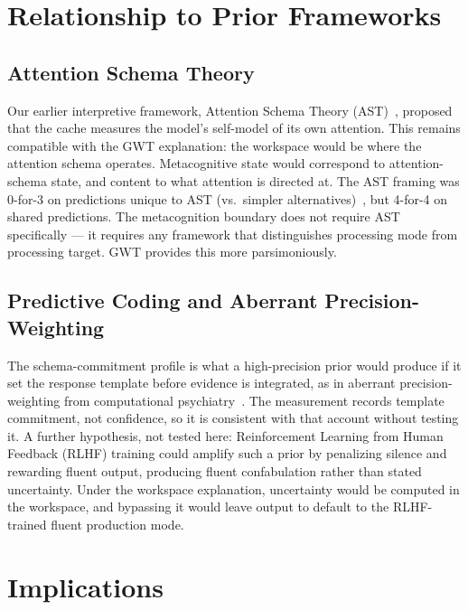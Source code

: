 \documentclass[11pt,a4paper]{article}
\begin{document}
\section{Relationship to Prior Frameworks}
\label{sec:frameworks}

\subsection{Attention Schema Theory}

Our earlier interpretive framework, Attention Schema
Theory (AST)~\citep{graziano2015attention}, proposed that the cache measures
the model's self-model of its own attention. This remains compatible
with the GWT explanation: the workspace would be where the attention schema
operates. Metacognitive state would correspond to attention-schema state, and content
to what attention is directed at. The AST framing was 0-for-3 on
predictions unique to AST (vs.\ simpler
alternatives)~\citep{lyra2026fable_analysis}, but 4-for-4 on shared
predictions. The metacognition boundary does not require AST
specifically --- it requires any framework that distinguishes
processing mode from processing target. GWT provides this more
parsimoniously.

\subsection{Predictive Coding and Aberrant Precision-Weighting}

The schema-commitment profile is what a high-precision prior would
produce if it set the response template before evidence is
integrated, as in aberrant precision-weighting from computational
psychiatry~\citep{adams2013computational}. The measurement records
template commitment, not confidence, so it is consistent with that
account without testing it. A further hypothesis, not tested here:
Reinforcement Learning from Human Feedback (RLHF) training could
amplify such a prior by penalizing silence and rewarding fluent
output, producing fluent confabulation rather than stated uncertainty.
Under the workspace explanation, uncertainty would be computed in the
workspace, and bypassing it would leave output to default to the
RLHF-trained fluent production mode.

\section{Implications}
\label{sec:implications}
\end{document}
